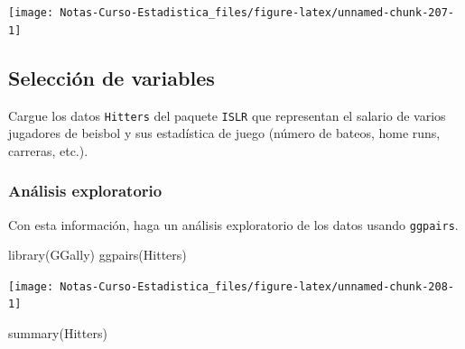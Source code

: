 \documentclass[
  12pt,
]{book}
\newenvironment{Shaded}{\begin{snugshade}}{\end{snugshade}}
\newcommand{\FunctionTok}[1]{\textcolor[rgb]{0.00,0.00,0.00}{#1}}
\newcommand{\NormalTok}[1]{#1}
\begin{document}
\begin{center}\texttt{[image: Notas-Curso-Estadistica\_files/figure-latex/unnamed-chunk-207-1]} \end{center}

\hypertarget{selecciuxf3n-de-variables-1}{%
\subsection{Selección de variables}\label{selecciuxf3n-de-variables-1}}

Cargue los datos \texttt{Hitters} del paquete \texttt{ISLR} que
representan el salario de varios jugadores de beisbol y sus estadística
de juego (número de bateos, home runs, carreras, etc.).

\hypertarget{anuxe1lisis-exploratorio}{%
\subsubsection{Análisis exploratorio}\label{anuxe1lisis-exploratorio}}

Con esta información, haga un análisis exploratorio de los datos usando
\texttt{ggpairs}.

\begin{Shaded}
\begin{Highlighting}[]
\FunctionTok{library}\NormalTok{(GGally)}
\FunctionTok{ggpairs}\NormalTok{(Hitters)}
\end{Highlighting}
\end{Shaded}

\begin{center}\texttt{[image: Notas-Curso-Estadistica\_files/figure-latex/unnamed-chunk-208-1]} \end{center}

\begin{Shaded}
\begin{Highlighting}[]
\FunctionTok{summary}\NormalTok{(Hitters)}
\end{Highlighting}
\end{Shaded}
\end{document}
